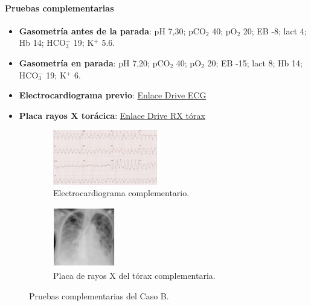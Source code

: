 \paragraph{Pruebas complementarias}
\begin{itemize}[topsep=0pt, partopsep=0pt,itemsep=0pt,parsep=0pt]
    \item \textbf{Gasometría antes de la parada}: pH 7,30; pCO$_2$ 40; pO$_2$ 20; EB -8; lact 4; Hb 14; HCO$_3^-$ 19; K$^+$ 5.6.
    \item \textbf{Gasometría en parada}: pH 7,20; pCO$_2$ 40; pO$_2$ 20; EB -15; lact 8; Hb 14; HCO$_3^-$ 19; K$^+$ 6.
    \item \textbf{Electrocardiograma previo}: \href{https://drive.google.com/file/d/1GBe9Wofw9bwhYcRkuK_dNy-t5fBXRC2E/view?usp=share\_link}{Enlace Drive ECG}
    \item \textbf{Placa rayos X torácica}: \href{https://drive.google.com/file/d/13VFzIBswwJGnbaB4wLQZWEIJGqibEyjh/view?usp=share\_link}{Enlace Drive RX tórax}
\end{itemize}
\begin{figure}[hptb]
    \centering
    \begin{subfigure}{.5\textwidth}
      \centering
      \includegraphics[width=0.5\textwidth]{./imagenes/UCIDoc-SVICasoBECG.png}
      \caption{\label{fig:Brusilov:SVI:CasoBECG}Electrocardiograma complementario.}
    \end{subfigure}%
    \begin{subfigure}{.5\textwidth}
      \centering
      \includegraphics[width=0.3\textwidth]{./imagenes/UCIDoc-SVICasoARXTorax.png}
      \caption{\label{fig:Brusilov:SVI:CasoARXTorax}Placa de rayos X del tórax complementaria.}
    \end{subfigure}
    \caption{\label{fig:Brusilov:SVI:PruebasCasoB}Pruebas complementarias del Caso B.}
\end{figure}

